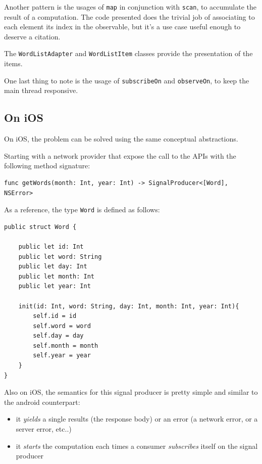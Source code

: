 Another pattern is the usages of \texttt{map} in conjunction with
\texttt{scan}, to accumulate the result of a computation. The code
presented does the trivial job of associating to each element its index
in the observable, but it's a use case useful enough to deserve a
citation.

The \texttt{WordListAdapter}  and \texttt{WordListItem} classes provide the presentation of the items. 

One last thing to note is the usage of \texttt{subscribeOn} and
\texttt{observeOn}, to keep the main thread responsive.

\subsection{On iOS}\label{on-ios}

On iOS, the problem can be solved using the same conceptual
abstractions.

Starting with a network provider that expose the call to the APIs with
the following method signature:

\begin{verbatim}
func getWords(month: Int, year: Int) -> SignalProducer<[Word], NSError>
\end{verbatim}

As a reference, the type \texttt{Word} is defined as follows:

\begin{verbatim}
public struct Word {

    public let id: Int
    public let word: String
    public let day: Int
    public let month: Int
    public let year: Int

    init(id: Int, word: String, day: Int, month: Int, year: Int){
        self.id = id
        self.word = word
        self.day = day
        self.month = month
        self.year = year
    }
}
\end{verbatim}

Also on iOS, the semantics for this signal producer is pretty simple and
similar to the android counterpart:

\begin{itemize}
\itemsep1pt\parskip0pt
\item
  it \emph{yields} a single results (the response body) or an error (a
  network error, or a server error, etc..)
\item
  it \emph{starts} the computation each times a consumer
  \emph{subscribes} itself on the signal producer
\end{itemize}


